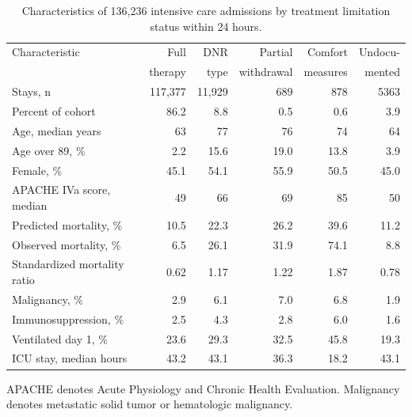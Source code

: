 \documentclass[12pt,a4paper]{article}
\begin{document}
\begin{table}[htbp]
\centering
\small
\caption{Characteristics of 136{,}236 intensive care admissions by treatment
limitation status within 24 hours.}
\label{tab:cohort}
\begin{tabular}{lrrrrr}
\toprule
Characteristic & Full & DNR & Partial & Comfort & Undocu- \\
 & therapy & type & withdrawal & measures & mented \\
\midrule
Stays, n                      & 117{,}377 & 11{,}929 & 689  & 878  & 5363 \\
Percent of cohort             & 86.2 & 8.8  & 0.5  & 0.6  & 3.9  \\
Age, median years             & 63   & 77   & 76   & 74   & 64   \\
Age over 89, \%               & 2.2  & 15.6 & 19.0 & 13.8 & 3.9  \\
Female, \%                    & 45.1 & 54.1 & 55.9 & 50.5 & 45.0 \\
APACHE IVa score, median      & 49   & 66   & 69   & 85   & 50   \\
Predicted mortality, \%       & 10.5 & 22.3 & 26.2 & 39.6 & 11.2 \\
Observed mortality, \%        & 6.5  & 26.1 & 31.9 & 74.1 & 8.8  \\
Standardized mortality ratio  & 0.62 & 1.17 & 1.22 & 1.87 & 0.78 \\
Malignancy, \%                & 2.9  & 6.1  & 7.0  & 6.8  & 1.9  \\
Immunosuppression, \%         & 2.5  & 4.3  & 2.8  & 6.0  & 1.6  \\
Ventilated day 1, \%          & 23.6 & 29.3 & 32.5 & 45.8 & 19.3 \\
ICU stay, median hours        & 43.2 & 43.1 & 36.3 & 18.2 & 43.1 \\
\bottomrule
\end{tabular}

\vspace{2pt}
\footnotesize APACHE denotes Acute Physiology and Chronic Health Evaluation.
Malignancy denotes metastatic solid tumor or hematologic malignancy.
\end{table}
\end{document}
